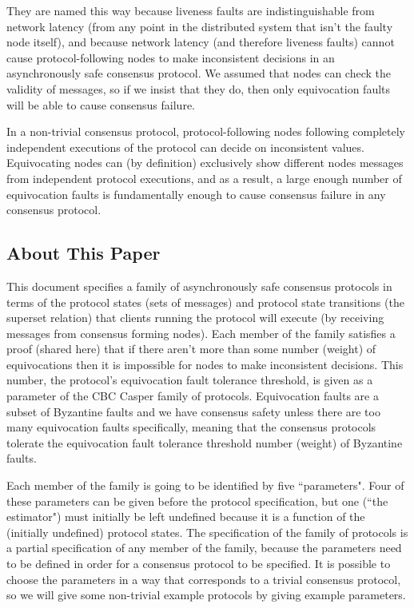 \documentclass{article}
\theoremstyle{definition}
\begin{document}
They are named this way because liveness faults are indistinguishable from network latency (from any point in the distributed system that isn't the faulty node itself), and because network latency (and therefore liveness faults) cannot cause protocol-following nodes to make inconsistent decisions in an asynchronously safe consensus protocol. We assumed that nodes can check the validity of messages, so if we insist that they do, then only equivocation faults will be able to cause consensus failure.

In a non-trivial consensus protocol, protocol-following nodes following completely independent executions of the protocol can decide on inconsistent values. Equivocating nodes can (by definition) exclusively show different nodes messages from independent protocol executions, and as a result, a large enough number of equivocation faults is fundamentally enough to cause consensus failure in any consensus protocol.

\subsection{About This Paper}

This document specifies a family of asynchronously safe consensus protocols in terms of the protocol states (sets of messages) and protocol state transitions (the superset relation) that clients running the protocol will execute (by receiving messages from consensus forming nodes). Each member of the family satisfies a proof (shared here) that if there aren't more than some number (weight) of equivocations then it is impossible for nodes to make inconsistent decisions. This number, the protocol's equivocation fault tolerance threshold, is given as a parameter of the CBC Casper family of protocols. Equivocation faults are a subset of Byzantine faults and we have consensus safety unless there are too many equivocation faults specifically, meaning that the consensus protocols tolerate the equivocation fault tolerance threshold number (weight) of Byzantine faults.

Each member of the family is going to be identified by five ``parameters". Four of these parameters can be given before the protocol specification, but one (``the estimator") must initially be left undefined because it is a function of the (initially undefined) protocol states. The specification of the family of protocols is a partial specification of any member of the family, because the parameters need to be defined in order for a consensus protocol to be specified. It is possible to choose the parameters in a way that corresponds to a trivial consensus protocol, so we will give some non-trivial example protocols by giving example parameters.
\end{document}
